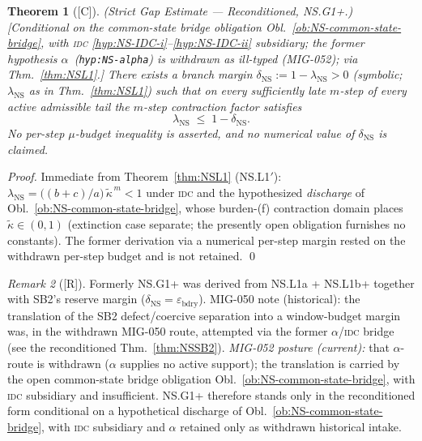 \documentclass[12pt,oneside]{amsbook}
\theoremstyle{plain}
\newtheorem{theorem}{Theorem}[section]
\theoremstyle{definition}
\theoremstyle{remark}
\newtheorem{remark}[theorem]{Remark}
\newcommand{\status}[1]{\textup{[#1]}}
\begin{document}
\begin{theorem}[\status{C}]\label{thm:NSG1plus}
\textup{(Strict Gap Estimate --- Reconditioned, NS.G1+.)}
\textup{[Conditional on the common-state bridge obligation
Obl.~\ref{ob:NS-common-state-bridge}, with \textsc{idc}
\eqref{hyp:NS-IDC-i}--\eqref{hyp:NS-IDC-ii} subsidiary; the former
hypothesis $\alpha$~(\texttt{hyp:NS-alpha}) is withdrawn as ill-typed
(MIG-052); via Thm.~\ref{thm:NSL1}.]}
There exists a branch margin
$\delta_{\mathrm{NS}} := 1 - \lambda_{\mathrm{NS}} > 0$ (symbolic;
$\lambda_{\mathrm{NS}}$ as in Thm.~\ref{thm:NSL1}) such that on
every sufficiently late $m$-step of every active admissible tail the
$m$-step contraction factor satisfies
\[
 \lambda_{\mathrm{NS}} \;\leq\; 1 - \delta_{\mathrm{NS}}.
\]
No per-step $\mu$-budget inequality is asserted, and no numerical
value of $\delta_{\mathrm{NS}}$ is claimed.
\end{theorem}
\begin{proof}
Immediate from Theorem~\ref{thm:NSL1} (NS.L1$'$):
$\lambda_{\mathrm{NS}} = \bigl((b+c)/a\bigr)\,\widetilde\kappa^{\,m}
< 1$ under \textsc{idc} and the hypothesized \emph{discharge} of
Obl.~\ref{ob:NS-common-state-bridge}, whose burden-(f) contraction
domain places $\widetilde\kappa \in (0,1)$ (extinction case
separate; the presently open obligation furnishes no constants). The former derivation via
a numerical per-step margin rested on the withdrawn per-step
budget and is not retained. \qed
\end{proof}


\begin{remark}[\status{R}]
Formerly NS.G1+ was derived from NS.L1a + NS.L1b+ together with
SB2's reserve margin ($\delta_{\mathrm{NS}} =
\varepsilon_{\mathrm{bdry}}$). MIG-050 note (historical): the translation of the
SB2 defect/coercive separation into a window-budget margin was, in
the withdrawn MIG-050 route, attempted via the former
$\alpha$/\textsc{idc} bridge (see the reconditioned
Thm.~\ref{thm:NSSB2}). \emph{MIG-052 posture (current):} that
$\alpha$-route is withdrawn ($\alpha$ supplies no active support);
the translation is carried by the open common-state bridge
obligation Obl.~\ref{ob:NS-common-state-bridge}, with \textsc{idc}
subsidiary and insufficient. NS.G1+ therefore stands only in the
reconditioned form conditional on a hypothetical discharge of
Obl.~\ref{ob:NS-common-state-bridge}, with \textsc{idc} subsidiary
and $\alpha$ retained only as withdrawn historical intake.
\end{remark}
\end{document}
